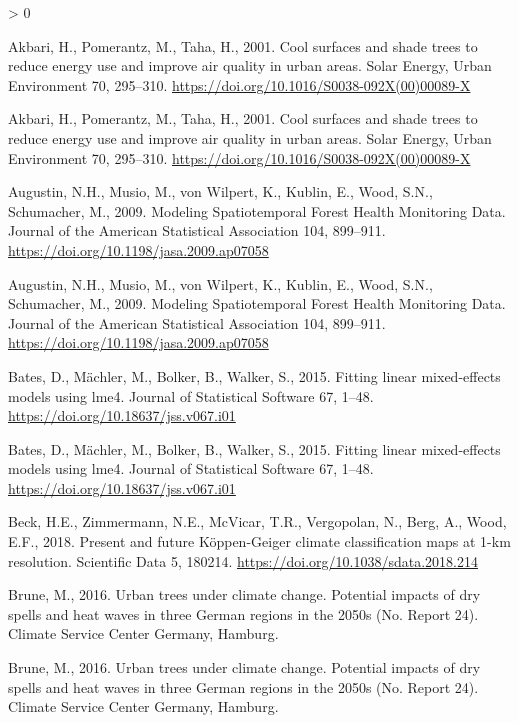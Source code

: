 \documentclass[
]{article}
\newlength{\cslhangindent}
\newenvironment{CSLReferences}[2] %
 {%
  \setlength{\parindent}{0pt}
  \ifodd #1 \everypar{\setlength{\hangindent}{\cslhangindent}}\ignorespaces\fi
  \ifnum #2 > 0
  \setlength{\parskip}{#2\baselineskip}
  \fi
 }%
 {}
\begin{document}
\hypertarget{refs}{}
\begin{CSLReferences}{1}{0}
\leavevmode\hypertarget{ref-akbari2001}{}%
Akbari, H., Pomerantz, M., Taha, H., 2001. Cool surfaces and shade trees to reduce energy use and improve air quality in urban areas. Solar Energy, Urban {Environment} 70, 295--310. \url{https://doi.org/10.1016/S0038-092X(00)00089-X}

\leavevmode\hypertarget{ref-akbari2001}{}%
Akbari, H., Pomerantz, M., Taha, H., 2001. Cool surfaces and shade trees to reduce energy use and improve air quality in urban areas. Solar Energy, Urban {Environment} 70, 295--310. \url{https://doi.org/10.1016/S0038-092X(00)00089-X}

\leavevmode\hypertarget{ref-augustin2009}{}%
Augustin, N.H., Musio, M., von Wilpert, K., Kublin, E., Wood, S.N., Schumacher, M., 2009. Modeling {Spatiotemporal Forest Health Monitoring Data}. Journal of the American Statistical Association 104, 899--911. \url{https://doi.org/10.1198/jasa.2009.ap07058}

\leavevmode\hypertarget{ref-augustin2009}{}%
Augustin, N.H., Musio, M., von Wilpert, K., Kublin, E., Wood, S.N., Schumacher, M., 2009. Modeling {Spatiotemporal Forest Health Monitoring Data}. Journal of the American Statistical Association 104, 899--911. \url{https://doi.org/10.1198/jasa.2009.ap07058}

\leavevmode\hypertarget{ref-bates2015}{}%
Bates, D., Mächler, M., Bolker, B., Walker, S., 2015. Fitting linear mixed-effects models using {lme4}. Journal of Statistical Software 67, 1--48. \url{https://doi.org/10.18637/jss.v067.i01}

\leavevmode\hypertarget{ref-bates2015}{}%
Bates, D., Mächler, M., Bolker, B., Walker, S., 2015. Fitting linear mixed-effects models using {lme4}. Journal of Statistical Software 67, 1--48. \url{https://doi.org/10.18637/jss.v067.i01}

\leavevmode\hypertarget{ref-beck2018}{}%
Beck, H.E., Zimmermann, N.E., McVicar, T.R., Vergopolan, N., Berg, A., Wood, E.F., 2018. Present and future {Köppen}-{Geiger} climate classification maps at 1-km resolution. Scientific Data 5, 180214. \url{https://doi.org/10.1038/sdata.2018.214}

\leavevmode\hypertarget{ref-brune2016}{}%
Brune, M., 2016. Urban trees under climate change. {Potential} impacts of dry spells and heat waves in three {German} regions in the 2050s (No. Report 24). {Climate Service Center Germany}, {Hamburg}.

\leavevmode\hypertarget{ref-brune2016}{}%
Brune, M., 2016. Urban trees under climate change. {Potential} impacts of dry spells and heat waves in three {German} regions in the 2050s (No. Report 24). {Climate Service Center Germany}, {Hamburg}.


\end{CSLReferences}
\end{document}
